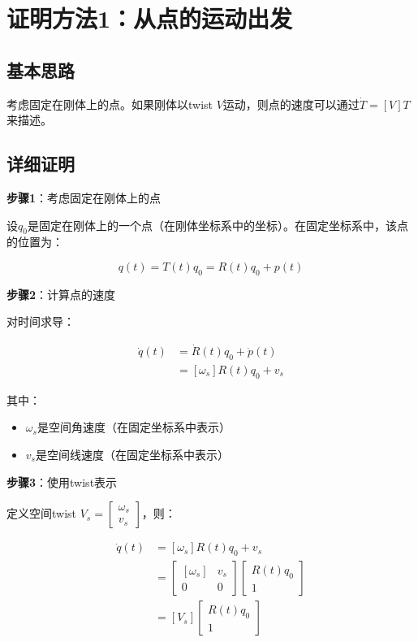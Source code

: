 \documentclass[12pt,a4paper]{article}
\begin{document}
\section{证明方法1：从点的运动出发}

\subsection{基本思路}

考虑固定在刚体上的点。如果刚体以twist $V$运动，则点的速度可以通过$\dot{T} = [V]T$来描述。

\subsection{详细证明}

\textbf{步骤1}：考虑固定在刚体上的点

设$q_0$是固定在刚体上的一个点（在刚体坐标系中的坐标）。在固定坐标系中，该点的位置为：

\begin{equation}
q(t) = T(t) q_0 = R(t) q_0 + p(t)
\end{equation}

\textbf{步骤2}：计算点的速度

对时间求导：

\begin{align}
\dot{q}(t) &= \dot{R}(t) q_0 + \dot{p}(t) \\
&= [\omega_s] R(t) q_0 + v_s
\end{align}

其中：
\begin{itemize}
\item $\omega_s$是空间角速度（在固定坐标系中表示）
\item $v_s$是空间线速度（在固定坐标系中表示）
\end{itemize}

\textbf{步骤3}：使用twist表示

定义空间twist $V_s = \begin{bmatrix} \omega_s \\ v_s \end{bmatrix}$，则：

\begin{align}
\dot{q}(t) &= [\omega_s] R(t) q_0 + v_s \\
&= \begin{bmatrix} [\omega_s] & v_s \\ 0 & 0 \end{bmatrix} \begin{bmatrix} R(t) q_0 \\ 1 \end{bmatrix} \\
&= [V_s] \begin{bmatrix} R(t) q_0 \\ 1 \end{bmatrix}
\end{align}
\end{document}
